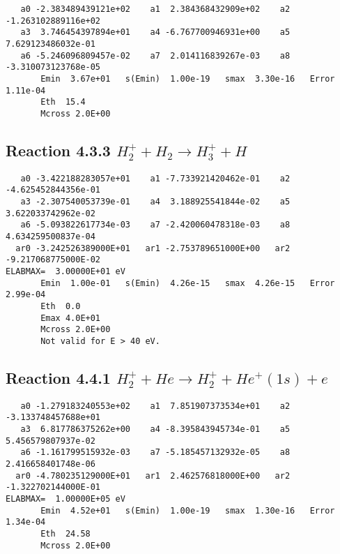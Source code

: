 \documentclass[12pt,dvipdfm]{article}
\begin{document}
\begin{small}\begin{verbatim}
   a0 -2.383489439121e+02    a1  2.384368432909e+02    a2 -1.263102889116e+02
   a3  3.746454397894e+01    a4 -6.767700946931e+00    a5  7.629123486032e-01
   a6 -5.246096809457e-02    a7  2.014116839267e-03    a8 -3.310073123768e-05
       Emin  3.67e+01   s(Emin)  1.00e-19   smax  3.30e-16   Error 1.11e-04
       Eth  15.4
       Mcross 2.0E+00
\end{verbatim}\end{small}






\newpage
\subsection{
Reaction 4.3.3 $   H_2^+ + H_2 \rightarrow H_3^+ + H$}


\begin{small}\begin{verbatim}
   a0 -3.422188283057e+01    a1 -7.733921420462e-01    a2 -4.625452844356e-01
   a3 -2.307540053739e-01    a4  3.188925541844e-02    a5  3.622033742962e-02
   a6 -5.093822617734e-03    a7 -2.420060478318e-03    a8  4.634259500837e-04
  ar0 -3.242526389000E+01   ar1 -2.753789651000E+00   ar2 -9.217068775000E-02
ELABMAX=  3.00000E+01 eV
       Emin  1.00e-01   s(Emin)  4.26e-15   smax  4.26e-15   Error  2.99e-04
       Eth  0.0
       Emax 4.0E+01
       Mcross 2.0E+00
       Not valid for E > 40 eV.
\end{verbatim}\end{small}

\newpage
\subsection{
Reaction 4.4.1 $   H_2^+ + He \rightarrow H_2^+ + He^+(1s) + e$}


\begin{small}\begin{verbatim}
   a0 -1.279183240553e+02    a1  7.851907373534e+01    a2 -3.133748457688e+01
   a3  6.817786375262e+00    a4 -8.395843945734e-01    a5  5.456579807937e-02
   a6 -1.161799515932e-03    a7 -5.185457132932e-05    a8  2.416658401748e-06
  ar0 -4.780235129000E+01   ar1  2.462576818000E+00   ar2 -1.322702144000E-01
ELABMAX=  1.00000E+05 eV
       Emin  4.52e+01   s(Emin)  1.00e-19   smax  1.30e-16   Error  1.34e-04
       Eth  24.58
       Mcross 2.0E+00
\end{verbatim}\end{small}
\end{document}

